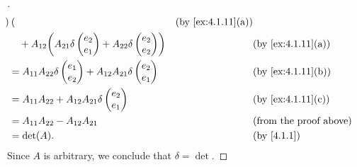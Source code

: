 \begin{proof}[]
\begin{align*}
{\begin{pmatrix}
			                                                                      \end{pmatrix}}             &  & \by{ex:4.1.11}[a]   \\
		          & \quad + A_{1 2} \pa{A_{2 1} \delta\begin{pmatrix}
				                                              e_2 \\
				                                              e_1
			                                              \end{pmatrix} + A_{2 2} \delta\begin{pmatrix}
				                                                                            e_2 \\
				                                                                            e_2
			                                                                            \end{pmatrix}}         &  & \by{ex:4.1.11}[a] \\
		          & = A_{1 1} A_{2 2} \delta\begin{pmatrix}
			                                    e_1 \\
			                                    e_2
		                                    \end{pmatrix} + A_{1 2} A_{2 1} \delta\begin{pmatrix}
			                                                                          e_2 \\
			                                                                          e_1
		                                                                          \end{pmatrix}     &  & \by{ex:4.1.11}[b]        \\
		          & = A_{1 1} A_{2 2} + A_{1 2} A_{2 1} \delta\begin{pmatrix}
			                                                      e_2 \\
			                                                      e_1
		                                                      \end{pmatrix} &  & \by{ex:4.1.11}[c]                                \\
		          & = A_{1 1} A_{2 2} - A_{1 2} A_{2 1}                       &  & \text{(from the proof above)}                  \\
		          & = \det(A).                                                &  & \by{4.1.1}
	\end{align*}
	Since \(A\) is arbitrary, we conclude that \(\delta = \det\).
\end{proof}

